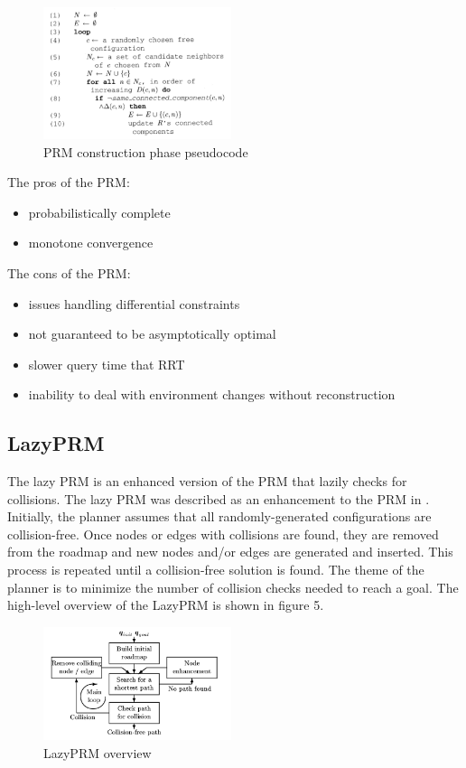 \documentclass[conference]{IEEEtran} \usepackage[T1]{fontenc} \usepackage[backend=biber, style=ieee]{biblatex}
\begin{document}
\begin{figure}
\label{figure4} 
\centering 
\includegraphics[width=0.49\textwidth]{prm}
\caption{PRM construction phase pseudocode}
\end{figure}

The pros of the PRM:
\begin{itemize}
\item probabilistically complete
\item monotone convergence
\end{itemize}

The cons of the PRM:
\begin{itemize}
\item issues handling differential constraints
\item not guaranteed to be asymptotically optimal
\item slower query time that RRT
\item inability to deal with environment changes without reconstruction
\end{itemize}

\subsection{LazyPRM} \label{LazyPRM}
The lazy PRM is an enhanced version of the PRM that lazily checks for collisions. The lazy PRM was described as an enhancement to the PRM in \cite{lazy_prm}. Initially, 
the planner assumes that all randomly-generated configurations are collision-free. Once nodes or edges with collisions are found, they are removed from the roadmap and
new nodes and/or edges are generated and inserted. This process is repeated until a collision-free solution is found. The theme of the planner is to minimize the number
of collision checks needed to reach a goal. The high-level overview of the LazyPRM is shown in figure 5.

\begin{figure}
\label{figure5} 
\centering 
\includegraphics[width=0.49\textwidth]{lazy_prm}
\caption{LazyPRM overview}
\end{figure}
\end{document}
